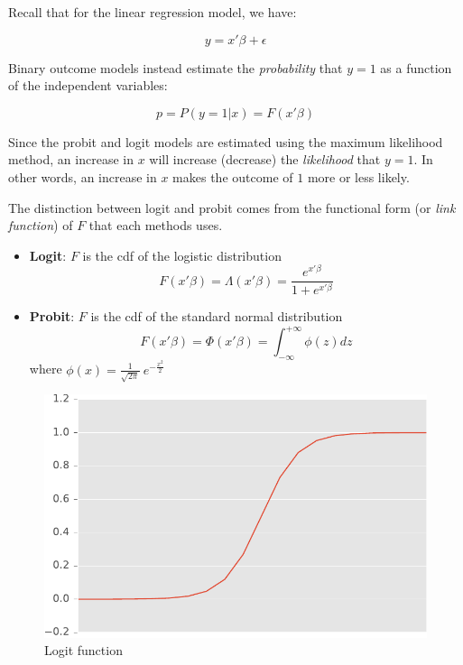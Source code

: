 Recall that for the linear regression model, we have:

\begin{equation}
    y = x'\beta + \epsilon
\end{equation}

Binary outcome models instead estimate the \textit{probability} that $y=1$ as a function of the independent variables:

\begin{equation}
    p = P(y=1 | x) = F(x'\beta)
\end{equation}

Since the probit and logit models are estimated using the maximum likelihood method, an increase in $x$ will increase (decrease) the \textit{likelihood} that $y=1$. In other words, an increase in $x$ makes the outcome of $1$ more or less likely.

The distinction between logit and probit comes from the functional form (or \textit{link function}) of $F$ that each methods uses.

\begin{itemize}
    \item \textbf{Logit}: $F$ is the cdf of the logistic distribution
    $$ F(x'\beta) = \Lambda(x'\beta) = \frac{e^{x'\beta}}{1+e^{x'\beta}} $$

    \item \textbf{Probit}: $F$ is the cdf of the standard normal distribution
    $$ F(x'\beta) = \Phi(x'\beta) = \int_{-\infty}^{+\infty} \phi(z)dz $$
    where $\phi(x) = \frac{1}{\sqrt{2\pi}}\ e^{-\frac{x^2}{2}}$
\end{itemize}

\begin{figure}[!ht]
    \centering
    \includegraphics[scale=0.6]{img/logit.pdf}
    \caption{Logit function}
    \label{fig:logit}
\end{figure}

